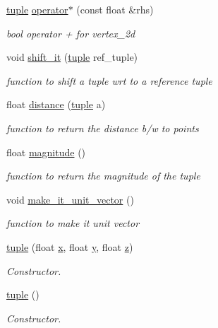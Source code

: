 \begin{DoxyCompactItemize}
\hyperlink{classtuple}{tuple} \hyperlink{classtuple_aa475aea27ce5ef5fe97f75243ce1bfd3}{operator$\ast$} (const float \&rhs)
\begin{DoxyCompactList}\small\item\em bool operator + for vertex\+\_\+2d \end{DoxyCompactList}\item 
void \hyperlink{classtuple_a83e59acf101fea3b456df1315b04e4b8}{shift\+\_\+it} (\hyperlink{classtuple}{tuple} ref\+\_\+tuple)
\begin{DoxyCompactList}\small\item\em function to shift a tuple wrt to a reference tuple \end{DoxyCompactList}\item 
float \hyperlink{classtuple_a841aaedd191b831b519d3eb7eeae288c}{distance} (\hyperlink{classtuple}{tuple} a)
\begin{DoxyCompactList}\small\item\em function to return the distance b/w to points \end{DoxyCompactList}\item 
float \hyperlink{classtuple_ad60cd51bb5c688f7193fe8f9e6c466b4}{magnitude} ()
\begin{DoxyCompactList}\small\item\em function to return the magnitude of the tuple \end{DoxyCompactList}\item 
void \hyperlink{classtuple_a9a0dddc69bd8da80d05ff0397dee7f68}{make\+\_\+it\+\_\+unit\+\_\+vector} ()
\begin{DoxyCompactList}\small\item\em function to make it unit vector \end{DoxyCompactList}\item 
\hyperlink{classtuple_aa764946ab904ef453886051dc107e476}{tuple} (float \hyperlink{classtuple_aa2a27c2f1604d90a8d9f8f786238d29a}{x}, float \hyperlink{classtuple_a7ca83d8377715732d23975e01bf317ec}{y}, float \hyperlink{classtuple_a0d96c11f0004c3682fcfdf9672d9b81d}{z})
\begin{DoxyCompactList}\small\item\em Constructor. \end{DoxyCompactList}\item 
\hyperlink{classtuple_ab9871705086ae665b261bfc8b81f73b0}{tuple} ()
\begin{DoxyCompactList}\small\item\em Constructor. \end{DoxyCompactList}\item 

\end{DoxyCompactItemize}
